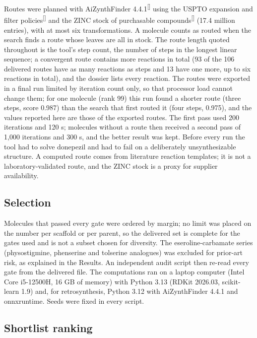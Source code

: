 \documentclass[11pt,a4paper]{article}
\renewcommand{\cite}[1]{\textsuperscript{[\citenum{#1}]}}
\begin{document}
Routes were planned with AiZynthFinder 4.4.1\cite{aizynth} using the USPTO expansion and filter policies\cite{thakkar} and the ZINC stock of purchasable compounds\cite{zinc} (17.4 million entries), with at most six transformations. A molecule counts as routed when the search finds a route whose leaves are all in stock. The route length quoted throughout is the tool's step count, the number of steps in the longest linear sequence; a convergent route contains more reactions in total (93 of the 106 delivered routes have as many reactions as steps and 13 have one more, up to six reactions in total), and the dossier lists every reaction. The routes were exported in a final run limited by iteration count only, so that processor load cannot change them; for one molecule (rank 99) this run found a shorter route (three steps, score 0.987) than the search that first routed it (four steps, 0.975), and the values reported here are those of the exported routes. The first pass used 200 iterations and 120 s; molecules without a route then received a second pass of 1,000 iterations and 300 s, and the better result was kept. Before every run the tool had to solve donepezil and had to fail on a deliberately unsynthesizable structure. A computed route comes from literature reaction templates; it is not a laboratory-validated route, and the ZINC stock is a proxy for supplier availability.

\subsection{Selection}
\label{sec:2.6}

Molecules that passed every gate were ordered by margin; no limit was placed on the number per scaffold or per parent, so the delivered set is complete for the gates used and is not a subset chosen for diversity. The eseroline-carbamate series (physostigmine, phenserine and tolserine analogues) was excluded for prior-art risk, as explained in the Results. An independent audit script then re-read every gate from the delivered file. The computations ran on a laptop computer (Intel Core i5-12500H, 16 GB of memory) with Python 3.13 (RDKit 2026.03, scikit-learn 1.9) and, for retrosynthesis, Python 3.12 with AiZynthFinder 4.4.1 and onnxruntime. Seeds were fixed in every script.

\subsection{Shortlist ranking}
\label{sec:best}
\end{document}
